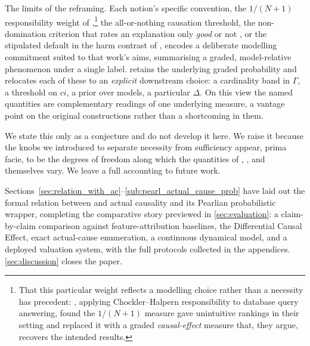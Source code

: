 The limits of the reframing. Each notion's specific convention, the $1/(N{+}1)$
responsibility weight of
\citet{chocklerResponsibilityBlameStructuralModel2004},\footnote{That this
particular weight reflects a modelling choice rather than a necessity has precedent:
\citet{salimiQuantifyingCausalEffects2016}, applying Chockler--Halpern
responsibility to database query answering, found the $1/(N{+}1)$ measure
gave unintuitive rankings in their setting and replaced it with a graded \emph{causal-effect}
measure that, they argue, recovers the intended results.} the all-or-nothing causation
threshold, the non-domination criterion that rates an explanation only \emph{good} or not
\citep{actualCausalityHalpern,beckersExplanationsXAI2022}, or the stipulated default in the harm contrast of
\citet{beckersHarm2022}, encodes a deliberate modelling commitment suited to that
work's aims, summarising a graded, model-relative phenomenon under a single label.
\ourapproach retains the underlying graded probability and relocates
each of these to an \emph{explicit} downstream choice: a cardinality band in $\Gamma$, a
threshold on $ci$, a prior over models, a particular $\Delta$. On this view the named
quantities are complementary readings of one underlying measure, a vantage point on
the original constructions rather than a shortcoming in them.

We state this only as a conjecture and do not develop it here. We raise it because the
knobs we introduced to separate necessity from sufficiency appear, prima facie, to be the
degrees of freedom along which the quantities of
\citet{chocklerResponsibilityBlameStructuralModel2004}, \citet{actualCausalityHalpern}, and
\citet{beckersSufficiency2021,beckersHarm2022} themselves vary. We leave a full accounting
to future work.

Sections~\ref{sec:relation_with_ac}--\ref{sub:pearl_actual_cause_prob}
have laid out the formal relation between \ourapproach and actual causality and
its Pearlian probabilistic wrapper, completing the comparative story previewed in
\cref{sec:evaluation}: a claim-by-claim comparison against feature-attribution
baselines, the Differential Causal Effect, exact actual-cause enumeration, a
continuous dynamical model, and a deployed valuation system, with the full
protocols collected in the appendices. \cref{sec:discussion} closes the paper.
